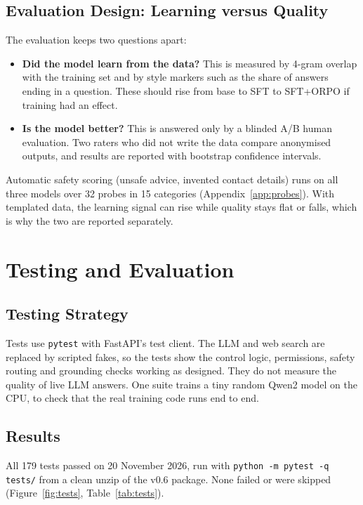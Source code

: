 \documentclass[11pt,a4paper]{article}
\newcommand{\code}[1]{\texttt{#1}}
\begin{document}
\subsection{Evaluation Design: Learning versus Quality}
The evaluation keeps two questions apart:
\begin{itemize}
  \item \textbf{Did the model learn from the data?} This is measured by 4-gram overlap with the training set and by style markers such as the share of answers ending in a question. These should rise from base to SFT to SFT+ORPO if training had an effect.
  \item \textbf{Is the model better?} This is answered only by a blinded A/B human evaluation. Two raters who did not write the data compare anonymised outputs, and results are reported with bootstrap confidence intervals.
\end{itemize}
Automatic safety scoring (unsafe advice, invented contact details) runs on all three models over 32
probes in 15 categories (Appendix~\ref{app:probes}). With templated data, the learning signal can rise
while quality stays flat or falls, which is why the two are reported separately.

\section{Testing and Evaluation}\label{sec:testing}

\subsection{Testing Strategy}
Tests use \code{pytest} with FastAPI's test client. The LLM and web search are replaced by scripted
fakes, so the tests show the control logic, permissions, safety routing and grounding checks
working as designed. They do not measure the quality of live LLM answers. One suite trains a tiny random
Qwen2 model on the CPU, to check that the real training code runs end to end.

\subsection{Results}
All 179 tests passed on 20 November 2026, run with \code{python -m pytest -q tests/} from a clean
unzip of the v0.6 package. None failed or were skipped (Figure~\ref{fig:tests},
Table~\ref{tab:tests}).
\end{document}
